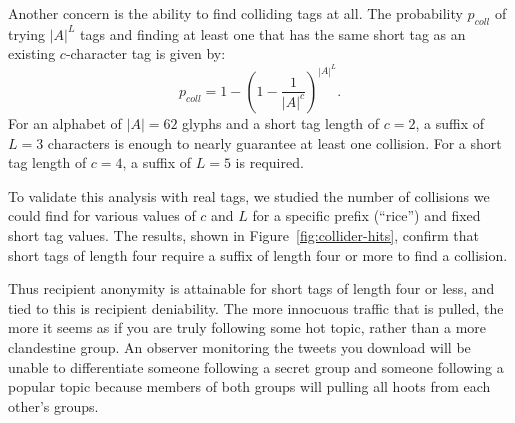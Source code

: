 \documentclass{sig-alternate-arxiv}
\newcommand{\hlfixme}[1]{\fixme{\hl{#1}}}
\newcommand{\msgs}{hoots\xspace}
\begin{document}

Another concern is the ability to find colliding tags at all. The
probability $p_{coll}$ of trying $|A|^L$ tags and finding at least one
that has the same short tag as an existing $c$-character tag is given
by:
%
\[p_{coll} = 1-\left(1-\frac{1}{|A|^c}\right)^{|A|^L}.\]
%
For an alphabet of $|A|=62$ glyphs and a short tag length of $c=2$, a
suffix of $L=3$ characters is enough to nearly guarantee at least one
collision. For a short tag length of $c=4$, a suffix of $L=5$ is
required. 

To validate this analysis with real tags, we studied the number of
collisions we could find for various values of $c$ and $L$ for a
specific prefix (``rice'') and fixed short tag values. The results,
shown in Figure~\ref{fig:collider-hits}, confirm that short tags of
length four require a suffix of length four or more to find a collision.

Thus recipient anonymity is attainable for short tags of length four or
less, and tied to this is recipient deniability. The more innocuous
traffic that is pulled, the more it seems as if you are truly following
some hot topic, rather than a more clandestine group. An observer
monitoring the tweets you download will be unable to differentiate
someone following a secret group and someone following a popular topic
because members of both groups will pulling all \msgs from each other's
groups.
\fi

\end{document}
